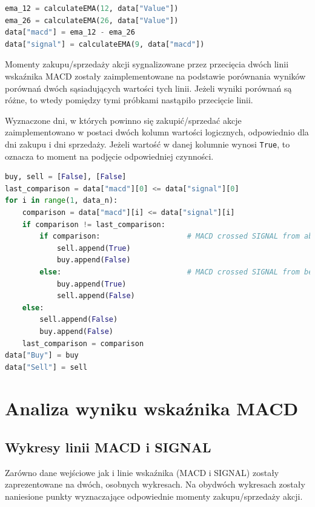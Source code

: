\documentclass{article}
\begin{document}
\begin{lstlisting}[language=Python, caption=Implementacja obliczenia wartości linii MACD i linii SIGNAL]
ema_12 = calculateEMA(12, data["Value"])
ema_26 = calculateEMA(26, data["Value"])
data["macd"] = ema_12 - ema_26
data["signal"] = calculateEMA(9, data["macd"])
\end{lstlisting}
\vspace{1.5em}

Momenty zakupu/sprzedaży akcji sygnalizowane przez przecięcia dwóch linii wskaźnika MACD zostały zaimplementowane na podstawie porównania wyników porównań dwóch sąsiadujących wartości tych linii. Jeżeli wyniki porównań są różne, to wtedy pomiędzy tymi próbkami nastąpiło przecięcie linii.

Wyznaczone dni, w których powinno się zakupić/sprzedać akcje zaimplementowano w postaci dwóch kolumn wartości logicznych, odpowiednio dla dni zakupu i dni sprzedaży. Jeżeli wartość w danej kolumnie wynosi \lstinline{True}, to oznacza to moment na podjęcie odpowiedniej czynności.

\vspace{0.75em}
\begin{lstlisting}[language=Python, caption=Implementacja reakcji na sygnały zakupu/sprzedaży akcji]
buy, sell = [False], [False]
last_comparison = data["macd"][0] <= data["signal"][0]
for i in range(1, data_n):
    comparison = data["macd"][i] <= data["signal"][i]
    if comparison != last_comparison:
        if comparison:                    # MACD crossed SIGNAL from above
            sell.append(True)
            buy.append(False)
        else:                             # MACD crossed SIGNAL from below
            buy.append(True)
            sell.append(False)
    else:
        sell.append(False)
        buy.append(False)
    last_comparison = comparison
data["Buy"] = buy
data["Sell"] = sell
\end{lstlisting}

\newpage
\section{Analiza wyniku wskaźnika MACD}
\subsection{Wykresy linii MACD i SIGNAL}

Zarówno dane wejściowe jak i linie wskaźnika (MACD i SIGNAL) zostały zaprezentowane na dwóch, osobnych wykresach. Na obydwóch wykresach zostały naniesione punkty wyznaczające odpowiednie momenty zakupu/sprzedaży akcji.
\end{document}

